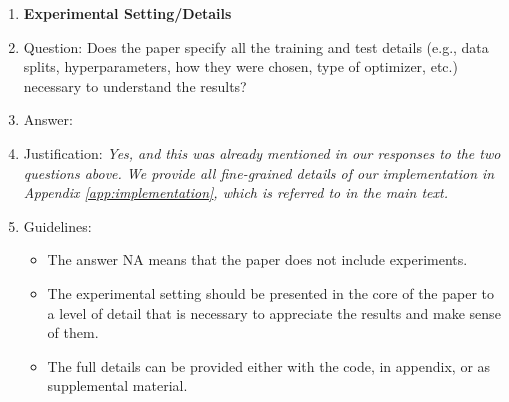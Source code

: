 \documentclass{article}
\theoremstyle{plain}
\begin{document}
\begin{enumerate}
\item {\bf Experimental Setting/Details}
    \item[] Question: Does the paper specify all the training and test details (e.g., data splits, hyperparameters, how they were chosen, type of optimizer, etc.) necessary to understand the results?
    \item[] Answer: \answerYes %
    \item[] Justification: \textit{Yes, and this was already mentioned in our responses to the two questions above. We provide all fine-grained details of our implementation in Appendix \ref{app:implementation}, which is referred to in the main text.}
    \item[] Guidelines:
    \begin{itemize}
        \item The answer NA means that the paper does not include experiments.
        \item The experimental setting should be presented in the core of the paper to a level of detail that is necessary to appreciate the results and make sense of them.
        \item The full details can be provided either with the code, in appendix, or as supplemental material.
    \end{itemize}


\end{enumerate}
\end{document}
